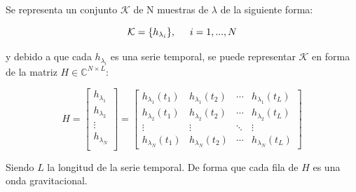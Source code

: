 Se representa un conjunto \( \mathcal{K} \) de N muestras de $\lambda$ de la siguiente forma:

\[ \mathcal{K}  = \{h_{\lambda_i}\}, \hspace{5mm} i = 1, ..., N\]

y debido a que cada $h_{\lambda_i}$ es una serie temporal, se puede representar $\mathcal{K}$ en forma de la matriz $H \in \mathbb{C}^{N\times L}$:

\[
H = 
\begin{bmatrix}
h_{\lambda_1} \\
h_{\lambda_2} \\
 \vdots \\
 h_{\lambda_N} \\
\end{bmatrix}
= 
\begin{bmatrix}
h_{\lambda_1}(t_1) & h_{\lambda_1}(t_2)  & \cdots & h_{\lambda_1}(t_L)\\
 h_{\lambda_2}(t_1) & h_{\lambda_2}(t_2)  & \cdots & h_{\lambda_2}(t_L)\\
 \vdots & \vdots & \ddots &  \vdots \\
h_{\lambda_N}(t_1) & h_{\lambda_N}(t_2)  & \cdots & h_{\lambda_N}(t_L)
\end{bmatrix}
\]

Siendo $L$ la longitud de la serie temporal. De forma que cada fila de $H$ es una onda gravitacional.